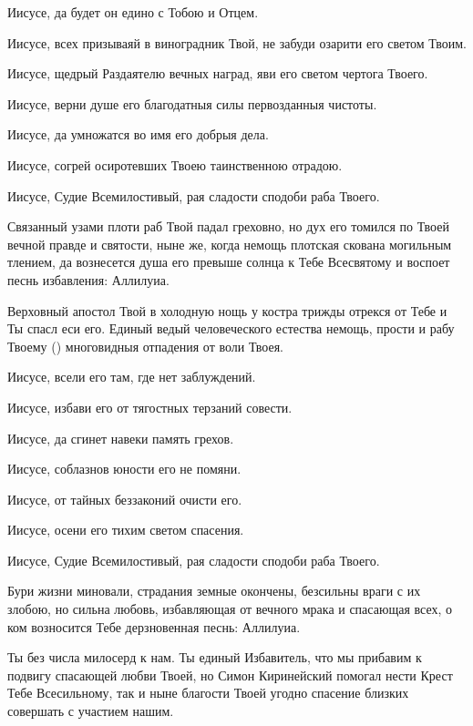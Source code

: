 \begin{mymulticols}
Иисусе, да будет он едино с Тобою и Отцем. 

Иисусе, всех призываяй в виноградник Твой, не забуди озарити его светом Твоим. 

Иисусе, щедрый Раздаятелю вечных наград, яви его светом чертога Твоего. 

Иисусе, верни душе его благодатныя силы первозданныя чистоты. 

Иисусе, да умножатся во имя его добрыя дела. 

Иисусе, согрей осиротевших Твоею таинственною отрадою. 

Иисусе, Судие Всемилостивый, рая сладости сподоби раба Твоего.




Связанный узами плоти раб Твой падал греховно, но дух его томился по Твоей вечной правде и святости, ныне же, когда немощь плотская скована могильным тлением, да вознесется душа его превыше солнца к Тебе Всесвятому и воспоет песнь избавления: Аллилуиа.




Верховный апостол Твой в холодную нощь у костра трижды отрекся от Тебе и Ты спасл еси его. Единый ведый человеческого естества немощь, прости и рабу Твоему () многовидныя отпадения от воли Твоея. 

Иисусе, всели его там, где нет заблуждений. 

Иисусе, избави его от тягостных терзаний совести. 

Иисусе, да сгинет навеки память грехов. 

Иисусе, соблазнов юности его не помяни. 

Иисусе, от тайных беззаконий очисти его. 

Иисусе, осени его тихим светом спасения. 

Иисусе, Судие Всемилостивый, рая сладости сподоби раба Твоего.




Бури жизни миновали, страдания земные окончены, безсильны враги с их злобою, но сильна любовь, избавляющая от вечного мрака и спасающая всех, о ком возносится Тебе дерзновенная песнь: Аллилуиа.




Ты без числа милосерд к нам. Ты единый Избавитель, что мы прибавим к подвигу спасающей любви Твоей, но Симон Киринейский помогал нести Крест Тебе Всесильному, так и ныне благости Твоей угодно спасение близких совершать с участием нашим. 


\end{mymulticols}
